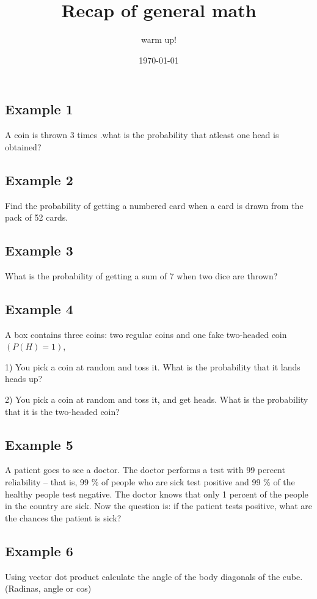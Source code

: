 \documentclass{article}
\title{Recap of general math}
\author{warm up!}
\date{\today}
\begin{document}
	
\maketitle
\subsection{Example 1}
A coin is thrown 3 times .what is the probability that atleast one head is obtained?
	
\subsection{Example 2}

Find the probability of getting a numbered card when a card is drawn from the pack of 52 cards.	
	
\subsection{Example 3}
What is the probability of getting a sum of 7 when two dice are thrown?
	

\subsection{Example 4}
A box contains three coins: two regular coins and one fake two-headed coin $(P(H)=1)$,

1) You pick a coin at random and toss it. What is the probability that it lands heads up?

2) You pick a coin at random and toss it, and get heads. What is the probability that it is the two-headed coin?
\subsection{Example 5}
A patient goes to see a doctor. The doctor performs a test with 99 percent reliability -- that is, 99 \% of people who are sick test positive and 99 \% of the healthy people test negative. The doctor knows that only 1 percent of the people in the country are sick. Now the question is: if the patient tests positive, what are the chances the patient is sick?

\subsection{Example 6}
Using vector dot product calculate the angle of the body diagonals of the cube. (Radinas, angle or cos)
\end{document}
